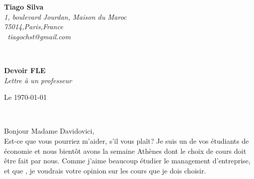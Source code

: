 \documentclass[11pt]{article}
\newcommand{\red}[1]{{\color{red}{#1}}}
\begin{document}
\hfill%
\begin{minipage}[t]{.6\textwidth}
\raggedleft%
{\bfseries Tiago Silva}\\[.35ex]
\small\itshape%
1, boulevard Jourdan, Maison du Maroc\\
75014,Paris,France\\[.35ex]
\Letter~tiagochst@gmail.com
\end{minipage}\\[1em]
%
\begin{minipage}[t]{.4\textwidth}
\raggedright%
{\bfseries Devoir FLE}\\[.35ex]
\small\itshape%
Lettre à un professeur\\
\end{minipage}
\hfill %
\begin{minipage}[t]{.4\textwidth}
\raggedleft %
Le \today
\end{minipage}\\[2em]
\raggedright


%




%



Bonjour Madame Davidovici,\\[1.5em]

Est-ce que vous pourriez m'aider, s'il vous plaît?
Je suis un de vos étudiants de économie et nous bientôt avons la semaine Athènes
dont le choix de cours doit être fait par nous. Comme j'aime beaucoup étudier le
management d’entreprise, et que \red{vous êtes spécialiste du domaine}, je voudrais votre opinion sur les cours que je dois choisir.
\end{document}
